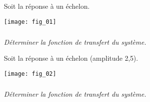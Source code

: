 \setcounter{exo}{0}

Soit la réponse à un échelon.
\begin{center}
\texttt{[image: fig\_01]}
\end{center}

\subparagraph{}
\textit{Déterminer la fonction de transfert du système.}


\vspace{.5cm}

Soit la réponse à un échelon (amplitude 2,5).
\begin{center}
\texttt{[image: fig\_02]}
\end{center}

\subparagraph{}
\textit{Déterminer la fonction de transfert du système.}

